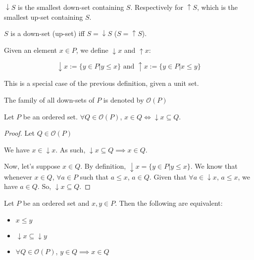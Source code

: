 \begin{remark}
$\downarrow S$ is the smallest down-set containing $S$. Respectively for $\uparrow S$, which is the smallest up-set containing $S$.

$S$ is a down-set (up-set) iff $S = \downarrow S$ ($S = \uparrow S$).
\end{remark}

\begin{definition}
Given an element $x \in P$, we define $\downarrow x$ and $\uparrow x$:

\begin{equation*}
\downarrow x := \{ y \in P | y \leq x \} \text{ and } \uparrow x := \{ y \in P | x \leq y \}
\end{equation*}
\end{definition}

\begin{remark}
This is a special case of the previous definition, given a unit set.
\end{remark}

\begin{notation}
  The family of all down-sets of $P$ is denoted by $\mathcal{O}(P)$
\end{notation}

\begin{lemma}
  Let $P$ be an ordered set. $\forall Q \in \mathcal{O}(P)$, $x \in Q \iff \downarrow x \subseteq Q$.
\end{lemma}

\begin{proof}
  Let $Q \in \mathcal{O}(P)$

  We have $x \in \downarrow x$. As such, $\downarrow x \subseteq Q \implies x \in Q$.

  Now, let's suppose $x \in Q$. By definition, $\downarrow x = \{y \in P | y \leq x\}$. We know that whenever $x \in Q$, $\forall a \in P$ such that $a \leq x$, $a \in Q$. Given that $\forall a \in \downarrow x$, $a \leq x$, we have $a \in Q$. So, $\downarrow x \subseteq Q$.
\end{proof}

\begin{lemma}
  Let $P$ be an ordered set and $x,y \in P$. Then the following are equivalent:
  \begin{itemize}
  \item $x \leq  y$
  \item $\downarrow x \subseteq \downarrow y$
  \item $\forall Q \in \mathcal{O}(P)$, $y \in Q \implies x \in Q$
  \end{itemize}
\end{lemma}

